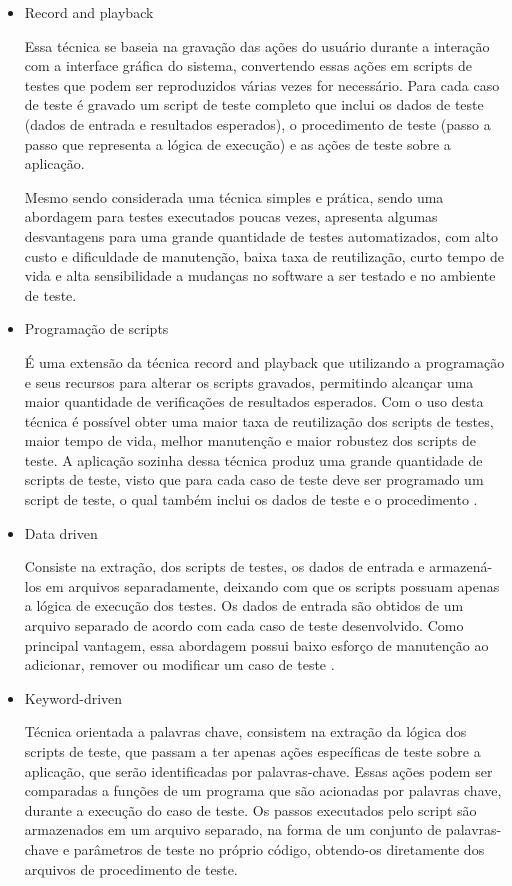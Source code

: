 \begin{itemize}

	\item Record and playback 
	
Essa técnica se baseia na gravação das ações do usuário durante a interação com a interface gráfica do sistema, convertendo essas ações em scripts de testes que podem ser reproduzidos várias vezes for necessário. Para cada caso de teste é gravado um script de teste completo que inclui os dados de teste (dados de entrada e resultados esperados), o procedimento de teste (passo a passo que representa a lógica de execução) e as ações de teste sobre a aplicação.

Mesmo sendo considerada uma técnica simples e prática, sendo uma abordagem para testes executados poucas vezes, apresenta algumas desvantagens para uma grande quantidade de testes automatizados, com alto custo e dificuldade de manutenção, baixa taxa de reutilização, curto tempo de vida e alta sensibilidade a mudanças no software a ser testado e no ambiente
de teste.

	\item Programação de scripts 
	
É uma extensão da técnica record and playback que utilizando a programação e seus recursos para alterar os scripts gravados, permitindo alcançar uma maior quantidade de verificações de resultados esperados. Com o uso desta técnica é possível obter uma maior taxa de reutilização dos scripts de testes, maior tempo de vida, melhor manutenção e maior robustez dos scripts de teste. A aplicação sozinha dessa técnica produz uma grande quantidade de scripts de teste, visto que para cada caso de teste deve ser programado um script de teste, o qual também inclui os dados de teste e o procedimento \cite{Fantinato2004}.

	\item Data driven 
	
Consiste na extração, dos scripts de testes, os dados de entrada e armazená-los em arquivos separadamente, deixando com que os scripts possuam apenas a lógica de execução dos testes. Os dados de entrada são obtidos de um arquivo separado de acordo com cada caso de teste desenvolvido. Como principal vantagem, essa abordagem possui baixo esforço de manutenção ao adicionar, remover ou modificar um caso de teste \cite{Zambelich1998}.

	\item Keyword-driven 
	
Técnica orientada a palavras chave, consistem na extração da lógica dos scripts de teste, que passam a ter apenas ações específicas de teste sobre a aplicação, que serão identificadas por palavras-chave. Essas ações  podem ser comparadas a funções de um programa que são acionadas por palavras chave, durante a execução do caso de teste. Os passos executados pelo script são armazenados em um arquivo separado, na forma de um conjunto de palavras-chave e parâmetros de teste no próprio código, obtendo-os diretamente dos arquivos de procedimento de teste.
\end{itemize}

